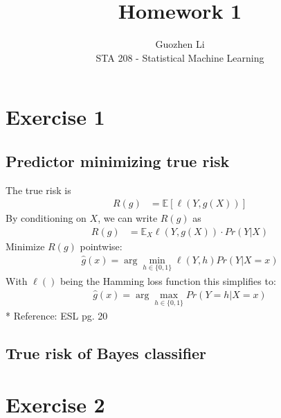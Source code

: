\documentclass[12pt]{article}
\begin{document}
 
 
 
\title{Homework 1}%
\author{Guozhen Li\\ %
STA 208 - Statistical Machine Learning} %
 
\maketitle


\section{Exercise 1}
\subsection{Predictor minimizing true risk}
The true risk is
\begin{align*}
	R(g) & = \mathbb{E}[\ell(Y,g(X))]
\end{align*}
By conditioning on $X$, we can write $R(g)$ as
\begin{align*}
	R(g) & = \mathbb{E}_X \ell(Y, g(X)) \cdot Pr(Y|X)
\end{align*}
Minimize $R(g)$ pointwise:
\begin{align*}
	\hat{g}(x) = \arg\min_{h\in\{0,1\}} \ell(Y, h) Pr(Y|X=x)
\end{align*}
With $\ell()$ being the Hamming loss function this simplifies to:
\begin{align*}
	\hat{g}(x) = \arg\max_{h\in\{0,1\}} Pr(Y=h|X=x)
\end{align*}
* Reference: ESL pg. 20

\subsection{True risk of Bayes classifier}




\section{Exercise 2}

 
 
\end{document}
